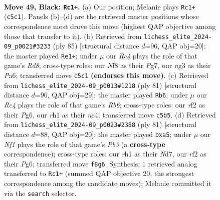 \documentclass[11pt]{article}
\begin{document}
\clearpage

\begin{figure}[p]\centering
\begin{subfigure}{0.46\textwidth}\centering
\resizebox{\linewidth}{!}{%
\newchessgame
\chessboard[
  setfen={5nk1/1p2Q2p/8/2rq3p/8/6N1/5R2/6KR b - - 11 49},
  showmover=false,
  pgfstyle=straightmove, color=movearrow, markmove={c5-c1}
]}
\caption{}
\end{subfigure}\hfill
\begin{subfigure}{0.46\textwidth}\centering
\resizebox{\linewidth}{!}{%
\newchessgame
\chessboard[
  setfen={8/1p4pk/p3Q3/3p4/8/8/1R2KP2/2qr4 b - - 15 43},
  showmover=false,
  pgfstyle=straightmove, color=movearrow, markmove={d1-e1}
]}
\caption{}
\end{subfigure}
\\[4pt]
\begin{subfigure}{0.46\textwidth}\centering
\resizebox{\linewidth}{!}{%
\newchessgame
\chessboard[
  setfen={3r4/2p1qpk1/6p1/8/2QnN3/1r1B4/8/R1K2R2 b - - 3 41},
  showmover=false,
  pgfstyle=straightmove, color=movearrow, markmove={b3-b6}
]}
\caption{}
\end{subfigure}\hfill
\begin{subfigure}{0.46\textwidth}\centering
\resizebox{\linewidth}{!}{%
\newchessgame
\chessboard[
  setfen={2k5/3n1Q2/1pq3p1/P2R4/2P1p3/4K3/8/8 b - - 0 41},
  showmover=false,
  pgfstyle=straightmove, color=movearrow, markmove={b6-a5}
]}
\caption{}
\end{subfigure}
\caption{\textbf{Move 49, Black: \texttt{Rc1+}.} (a) Our position; Melanie plays \texttt{Rc1+} (\texttt{c5c1}). Panels (b)--(d) are the retrieved master positions whose correspondence most drove this move (highest QAP objective among those that transfer to it). (b) Retrieved from \texttt{lichess\_elite\_2024-09\_p0021\#3233} (ply 85) [structural distance $d$=96, QAP obj=20]: the master played \texttt{Re1+}; under $\mu$ our \emph{Rc4} plays the role of that game's \emph{Rd8}; cross-type roles: our \emph{N}f8 as their \emph{P}g7, our \emph{n}g3 as their \emph{P}a6; transferred move \texttt{c5c1} \textbf{(endorses this move)}. (c) Retrieved from \texttt{lichess\_elite\_2024-09\_p0013\#1218} (ply 81) [structural distance $d$=96, QAP obj=29]: the master played \texttt{Rb6}; under $\mu$ our \emph{Rc4} plays the role of that game's \emph{Rb6}; cross-type roles: our \emph{r}f2 as their \emph{P}g6, our \emph{r}h1 as their \emph{n}e4; transferred move \texttt{c5b5}. (d) Retrieved from \texttt{lichess\_elite\_2024-09\_p0023\#2388} (ply 81) [structural distance $d$=88, QAP obj=20]: the master played \texttt{bxa5}; under $\mu$ our \emph{Nf1} plays the role of that game's \emph{Pb3} (a \textbf{cross-type} correspondence); cross-type roles: our \emph{r}h1 as their \emph{N}d7, our \emph{r}f2 as their \emph{P}g6; transferred move \texttt{f8g6}. Synthesis: 1 retrieved analog transferred to \texttt{Rc1+} (summed QAP objective 20, the strongest correspondence among the candidate moves); Melanie committed it via the \texttt{search} selector.}
\label{fig:thought-m97}
\end{figure}
\end{document}
